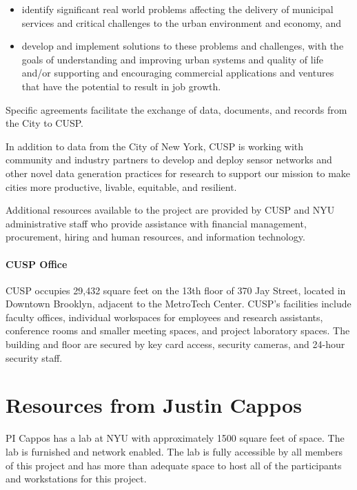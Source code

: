 \begin{itemize}[nolistsep]
    \item identify significant real world problems affecting the delivery of municipal services and critical challenges to the urban environment and economy, and
    \item develop and implement solutions to these problems and challenges, with the goals of understanding and improving urban systems and quality of life and/or supporting and encouraging commercial applications and ventures that have the potential to result in job growth.
\end{itemize}


Specific agreements facilitate the exchange of data, documents, and records from the City to CUSP.

In addition to data from the City of New York, CUSP is working with community and industry partners to develop and deploy sensor networks and other novel data generation practices for research to support our mission to make cities more productive, livable, equitable, and resilient.

Additional resources available to the project are provided by CUSP and NYU administrative staff who provide assistance with financial management, procurement, hiring and human resources, and information technology.




\paragraph{CUSP Office}
CUSP occupies 29,432 square feet on the 13th floor of 370 Jay Street, located in Downtown Brooklyn, adjacent to the MetroTech Center. CUSP's facilities include faculty offices, individual workspaces for employees and research assistants, conference rooms and smaller meeting spaces, and project laboratory spaces. The building and floor are secured by key card access, security cameras, and 24-hour security staff.









\section*{Resources from Justin Cappos}

PI Cappos has a lab at NYU with approximately 1500 square feet
of space.   The lab is furnished and network enabled.   The lab is fully
accessible by all members of this project and has more than adequate space
to host all of the participants and workstations for this project.

